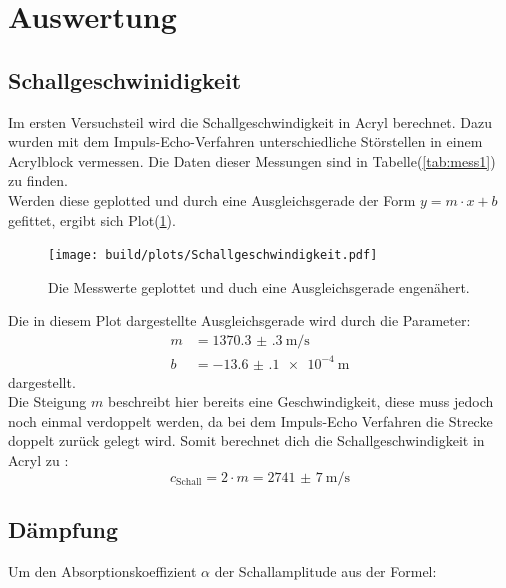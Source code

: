 \section{Auswertung}

    \subsection{Schallgeschwinidigkeit}

        \noindent Im ersten Versuchsteil wird die Schallgeschwindigkeit in Acryl berechnet. Dazu wurden mit dem Impuls-Echo-Verfahren 
        unterschiedliche Störstellen in einem Acrylblock vermessen. Die Daten dieser Messungen sind in Tabelle(\ref{tab:mess1}) zu finden.\\
        Werden diese geplotted und durch eine Ausgleichsgerade der Form $y = m \cdot x + b$ gefittet, ergibt sich Plot(\ref{img:py_sch}).

        \begin{figure}[ht]
            \centering
            \texttt{[image: build/plots/Schallgeschwindigkeit.pdf]}
            \caption{Die Messwerte geplottet und duch eine Ausgleichsgerade engenähert.}
            \label{img:py_sch}
        \end{figure}

        \noindent Die in diesem Plot dargestellte Ausgleichsgerade wird durch die Parameter: 
            \begin{align*}
                m &= \SI{1370.3(3)}{\metre\per\second}\\
                b &= \SI{-13.6(1)e-4}{\metre}       
            \end{align*}
        \noindent
        dargestellt.\\
        Die Steigung $m$ beschreibt hier bereits eine Geschwindigkeit, diese muss jedoch noch einmal verdoppelt werden, da bei dem 
        Impuls-Echo Verfahren die Strecke doppelt zurück gelegt wird. Somit berechnet dich die Schallgeschwindigkeit in Acryl zu : 
        \begin{equation*}
            c_{\text{Schall}} = 2 \cdot m = \SI{2741(7)}{\metre\per\second}
        \end{equation*}
        
    \subsection{Dämpfung}

        \noindent Um den Absorptionskoeffizient $\alpha$ der Schallamplitude aus der Formel:

